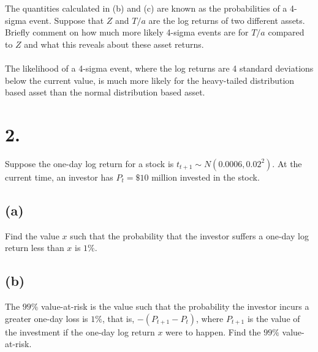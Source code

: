 \documentclass{article}
\begin{document}
{The quantities calculated in (b) and (c) are known as the probabilities of a 4-sigma event. Suppose that $Z$ and $T/a$ are the log returns of two different assets. Briefly comment on how much more likely 4-sigma events are for $T/a$ compared to $Z$ and what this reveals about these asset returns. \\ \\
The likelihood of a 4-sigma event, where the log returns are 4 standard deviations below the current value, is much more likely for the heavy-tailed distribution based asset than the normal distribution based asset.

}

\section*{2.}
{\Large

Suppose the one-day log return for a stock is $t_{t+1} \sim N(0.0006, 0.02^2)$. At the current time, an investor has $P_t = \$ 10$ million invested in the stock.  

\subsection*{(a)}

Find the value $x$ such that the probability that the investor suffers a one-day log return less than $x$ is $1\%$.

\subsection*{(b)}

The $99\%$ value-at-risk is the value such that the probability the investor incurs a greater one-day loss is $1\%$, that is, $-(P_{t+1} - P_t)$, where $P_{t+1}$ is the value of the investment if the one-day log return $x$ were to happen. Find the $99\%$ value-at-risk. 

}
\end{document}
